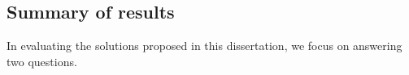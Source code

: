 





\subsection{Summary of results}
In evaluating the solutions proposed in this dissertation, 
we focus on answering two questions.

